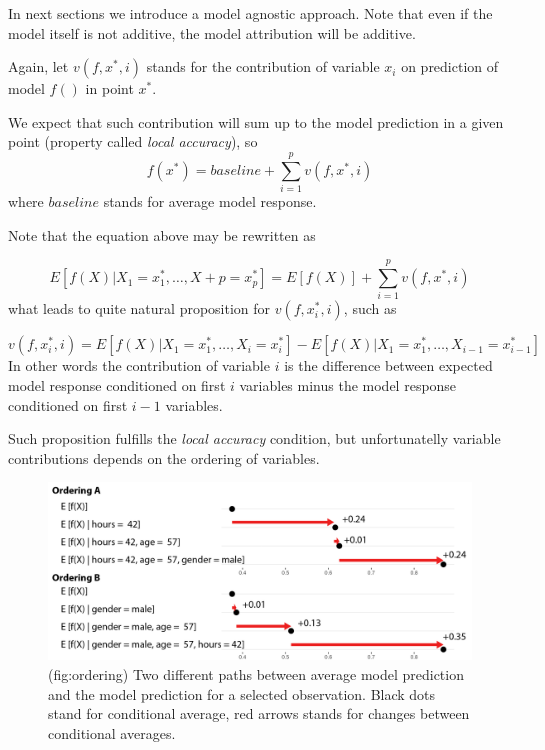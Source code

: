 \documentclass[]{book}
\theoremstyle{definition}
\theoremstyle{definition}
\theoremstyle{definition}
\theoremstyle{remark}
\begin{document}
In next sections we introduce a model agnostic approach. Note that even
if the model itself is not additive, the model attribution will be
additive.

Again, let \(v(f, x^*, i)\) stands for the contribution of variable
\(x_i\) on prediction of model \(f()\) in point \(x^*\).

We expect that such contribution will sum up to the model prediction in
a given point (property called \emph{local accuracy}), so \[
f(x^*) = baseline + \sum_{i=1}^p v(f, x^*, i)
\] where \(baseline\) stands for average model response.

Note that the equation above may be rewritten as

\[
E [f(X)|X_1 = x_1^*, \ldots, X+p = x_p^*] = E[f(X)] + \sum_{i=1}^p v(f, x^*, i)
\] what leads to quite natural proposition for \(v(f, x^*_i, i)\), such
as

\[
v(f, x^*_i, i) = E [f(X) | X_1 = x_1^*, \ldots, X_i = x_i^*] - E [f(X) | X_1 = x_1^*, \ldots, X_{i-1} = x_{i-1}^*] 
\] In other words the contribution of variable \(i\) is the difference
between expected model response conditioned on first \(i\) variables
minus the model response conditioned on first \(i-1\) variables.

Such proposition fulfills the \emph{local accuracy} condition, but
unfortunatelly variable contributions depends on the ordering of
variables.

\begin{figure}

{\centering \includegraphics[width=1\linewidth]{figure/ordering} 

}

\caption{(fig:ordering) Two different paths between average model prediction and the model prediction for a selected observation. Black dots stand for conditional average, red arrows stands for changes between conditional averages.}\label{fig:ordering}
\end{figure}
\end{document}
